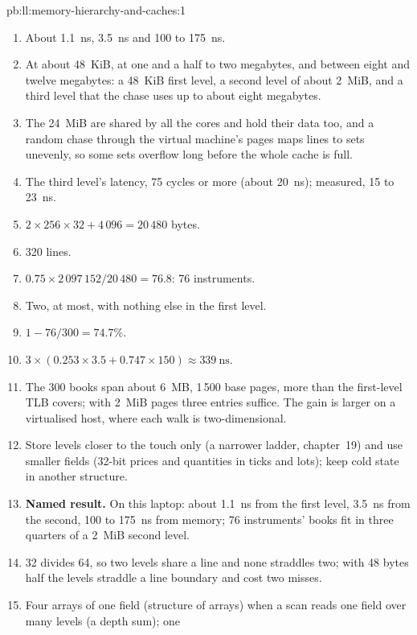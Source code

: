 \begin{solution}{pb:ll:memory-hierarchy-and-caches:1}
\begin{enumerate}
\item About \qty{1.1}{\nano\second}, \qty{3.5}{\nano\second} and 100 to \qty{175}{\nano\second}.
\item At about 48~KiB, at one and a half to two megabytes, and between eight and twelve megabytes: a 48~KiB first level,
a second level of about 2~MiB, and a third level that the chase uses up to about eight megabytes.
\item The 24~MiB are shared by all the cores and hold their data too, and a random chase through the virtual machine's
pages maps lines to sets unevenly, so some sets overflow long before the whole cache is full.
\item The third level's latency, 75 cycles or more (about \qty{20}{\nano\second}); measured, 15 to
\qty{23}{\nano\second}.
\item $2 \times 256 \times 32 + 4\,096 = 20\,480$ bytes.
\item 320 lines.
\item $0.75 \times 2\,097\,152 / 20\,480 = 76.8$: 76 instruments.
\item Two, at most, with nothing else in the first level.
\item $1 - 76/300 = 74.7\%$.
\item $3 \times (0.253 \times 3.5 + 0.747 \times 150) \approx \qty{339}{\nano\second}$.
\item The 300 books span about 6~MB, 1\,500 base pages, more than the first-level TLB covers; with 2~MiB pages three
entries suffice. The gain is larger on a virtualised host, where each walk is two-dimensional.
\item Store levels closer to the touch only (a narrower ladder, chapter~19) and use smaller fields (32-bit prices and
quantities in ticks and lots); keep cold state in another structure.
\item \textbf{Named result.} On this laptop: about \qty{1.1}{\nano\second} from the first level,
\qty{3.5}{\nano\second} from the second, 100 to \qty{175}{\nano\second} from memory; 76 instruments' books fit in
three quarters of a 2~MiB second level.
\item 32 divides 64, so two levels share a line and none straddles two; with 48 bytes half the levels straddle a line
boundary and cost two misses.
\item Four arrays of one field (structure of arrays) when a scan reads one field over many levels (a depth sum); one

\end{enumerate}
\end{solution}
